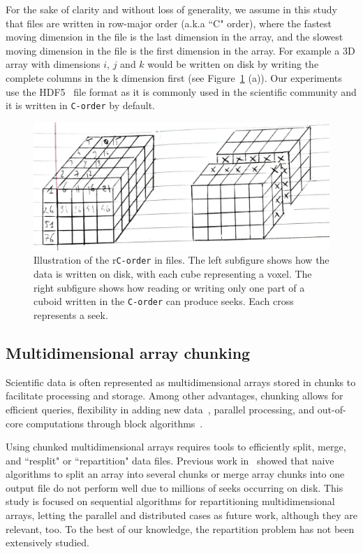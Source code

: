 \documentclass[conference]{IEEEtran}
\begin{document}
For the sake of clarity and without loss of generality,
 we assume in this study that files are written in row-major order (a.k.a
``C" order), where the fastest moving dimension in the file is the last
dimension in the array, and the slowest moving dimension in the file is the first
dimension in the array. For example a 3D array with dimensions $i$, $j$ and $k$
would be written on disk by writing the complete columns in the k dimension first
(see Figure~\ref{fig:seeks_and_rowmajor} (a)).
Our experiments use the HDF5~\cite{hdf5} file format as it is commonly used in the
scientific community and it is written in \texttt{C-order} by default.

\begin{figure}[h]
  \centering
  \includegraphics[scale=0.35]{./figures/new/seeks_and_rowmajor.jpeg}
  \caption{Illustration of the r\texttt{C-order} in files. The left subfigure
  shows how the data is written on disk, with each cube representing a voxel. The
  right subfigure shows how reading or writing only one part of a cuboid written
  in the \texttt{C-order} can produce seeks. Each cross represents a seek.}
  \label{fig:seeks_and_rowmajor}
\end{figure}

\subsection{Multidimensional array chunking}
Scientific data is often represented as multidimensional arrays stored in
chunks to facilitate processing and storage. Among other advantages, chunking
allows for efficient queries, flexibility in adding new
data~\cite{optimal_chuking}, parallel processing, and out-of-core
computations through block algorithms~\cite{matthew_rocklin-proc-scipy-2015}.

Using chunked multidimensional arrays requires tools to efficiently split,
merge, and ``resplit" or ``repartition" data files. Previous work in~\cite{seqalgorithms}
showed that naive algorithms to split an array into several chunks or merge
array chunks into one output file do not perform well due to millions of seeks
occurring on disk. This study is focused on sequential algorithms for
repartitioning multidimensional arrays, letting the parallel and distributed
cases as future work, although they are relevant, too. To the best of our
knowledge, the repartition problem has not been extensively studied.
\end{document}

